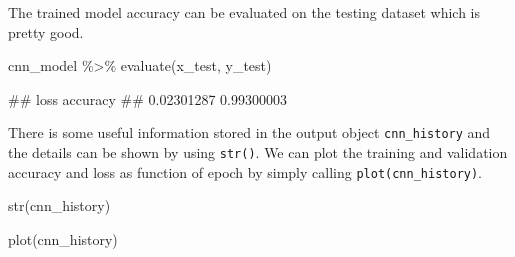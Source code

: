 \documentclass[
  12pt,
]{krantz}
\makeatletter
\newenvironment{Shaded}{\begin{snugshade}}{\end{snugshade}}
\newcommand{\FunctionTok}[1]{\textcolor[rgb]{0,0,0}{#1}}
\newcommand{\NormalTok}[1]{#1}
\newcommand{\SpecialCharTok}[1]{\textcolor[rgb]{0,0,0}{#1}}
\newenvironment{kframe}{%
\medskip{}
\setlength{\fboxsep}{.8em}
 \def\at@end@of@kframe{}%
 \ifinner\ifhmode%
  \def\at@end@of@kframe{\end{minipage}}%
  \begin{minipage}{\columnwidth}%
 \fi\fi%
 \def\FrameCommand##1{\hskip\@totalleftmargin \hskip-\fboxsep
 \colorbox{shadecolor}{##1}\hskip-\fboxsep
     \hskip-\linewidth \hskip-\@totalleftmargin \hskip\columnwidth}%
 \MakeFramed {\advance\hsize-\width
   \@totalleftmargin\z@ \linewidth\hsize
   \@setminipage}}%
 {\par\unskip\endMakeFramed%
 \at@end@of@kframe}
\renewenvironment{Shaded}{\begin{kframe}}{\end{kframe}}
\makeatother
\begin{document}
The trained model accuracy can be evaluated on the testing dataset which is pretty good.

\begin{Shaded}
\begin{Highlighting}[]
\NormalTok{cnn\_model }\SpecialCharTok{\%\textgreater{}\%} \FunctionTok{evaluate}\NormalTok{(x\_test, y\_test)}
\end{Highlighting}
\end{Shaded}

\begin{Shaded}
\begin{Highlighting}[]
\NormalTok{\#\#       loss   accuracy }
\NormalTok{\#\# 0.02301287 0.99300003}
\end{Highlighting}
\end{Shaded}

There is some useful information stored in the output object \texttt{cnn\_history} and the details can be shown by using \texttt{str()}. We can plot the training and validation accuracy and loss as function of epoch by simply calling \texttt{plot(cnn\_history)}.

\begin{Shaded}
\begin{Highlighting}[]
\FunctionTok{str}\NormalTok{(cnn\_history)}
\end{Highlighting}
\end{Shaded}

\begin{Shaded}
\end{Shaded}

\begin{Shaded}
\begin{Highlighting}[]
\FunctionTok{plot}\NormalTok{(cnn\_history)}
\end{Highlighting}
\end{Shaded}
\end{document}
